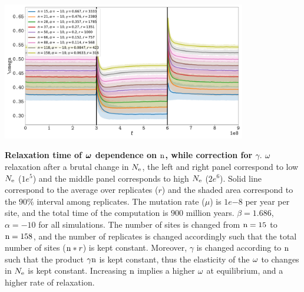 \documentclass{article}
\begin{document}
\begin{center}
	\includegraphics[width=0.8\textwidth] {artworks/Relaxation-Stability-Gamma.pdf}
\end{center}
\textbf{Relaxation time of $\bm{\omega}$ dependence on $\text{n}$, while correction for $\gamma$}.
$\omega$ relaxation after a brutal change in $N_{\mathrm{e}}$, the left and right panel correspond to low $N_{\mathrm{e}}$ ($1e^{5}$) and the middle panel corresponds to high $N_{\mathrm{e}}$ ($2e^{6}$). 
Solid line correspond to the average over replicates ($r$) and the shaded area correspond to the $90\%$ interval among replicates. 
The mutation rate ($\mu$) is $1e{-8}$ per year per site, and the total time of the computation is $900$ million years.
$\beta=1.686$, $\alpha=-10$ for all simulations. The number of sites is changed from $\text{n}=15$ to $\text{n}=158$, and the number of replicates is changed accordingly such that the total number of sites ($\text{n}*r$) is kept constant.
Moreover, $\gamma$ is changed according to $\text{n}$ such that the product $\gamma\text{n}$ is kept constant, thus the  elasticity of the $\omega$ to changes in $N_{\mathrm{e}}$ is kept constant.
Increasing $\text{n}$ implies a higher $\omega$ at equilibrium, and a higher rate of relaxation.
\end{document}
